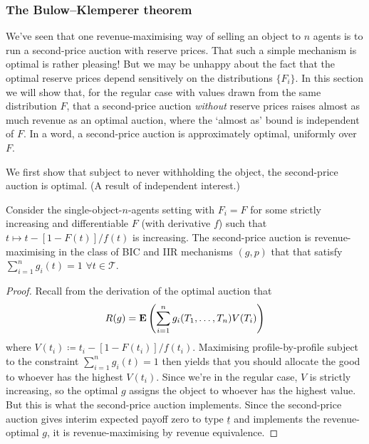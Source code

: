 \documentclass[11pt,letterpaper,reqno,oneside]{article}
\begin{document}
\subsubsection{The Bulow--Klemperer theorem}
\label{sec:mech_desi:several_agents_one_dimension:bulow_klemperer}

We've seen that one revenue-maximising way of selling an object to $n$ agents is to run a second-price auction with reserve prices. That such a simple mechanism is optimal is rather pleasing! But we may be unhappy about the fact that the optimal reserve prices depend sensitively on the distributions $\{ F_i \}$. In this section we will show that, for the regular case with values drawn from the same distribution $F$, that a second-price auction \emph{without} reserve prices raises almost as much revenue as an optimal auction, where the `almost as' bound is independent of $F$. In a word, a second-price auction is approximately optimal, uniformly over $F$.


We first show that subject to never withholding the object, the second-price auction is optimal. (A result of independent interest.)
%
\begin{lemma}
	\label{lemma:2nd_price_optimal}
	Consider the single-object-$n$-agents setting with $F_i=F$ for some strictly increasing and differentiable $F$ (with derivative $f$) such that $t \mapsto t - [1-F(t)] / f(t)$ is increasing. The second-price auction is revenue-maximising in the class of BIC and IIR mechanisms $(g,p)$ that that satisfy $\sum_{i=1}^n g_i(t)=1$ $\forall t \in \mathcal{T}$.
\end{lemma}


\begin{proof}
	Recall from the derivation of the optimal auction that
	\begin{equation*}
		R(g)
		= \mathbf{E}\left( \sum_{i=1}^n 
		g_i(T_1,\dots,T_n) V(T_i)
		\right) 
	\end{equation*}
	where $V(t_i) \coloneqq t_i - [ 1 - F(t_i) ] / f(t_i)$. Maximising profile-by-profile subject to the constraint $\sum_{i=1}^n g_i(t) = 1$ then yields that you should allocate the good to whoever has the highest $V(t_i)$. Since we're in the regular case, $V$ is strictly increasing, so the optimal $g$ assigns the object to whoever has the highest value. But this is what the second-price auction implements. Since the second-price auction gives interim expected payoff zero to type $\underline{t}$ and implements the revenue-optimal $g$, it is revenue-maximising by revenue equivalence.
\end{proof}
\end{document}
